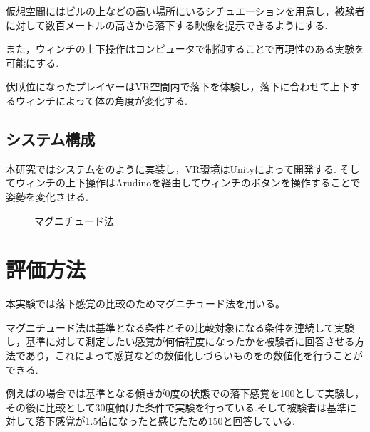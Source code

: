 \documentclass[uplatex]{jsarticle}
\begin{document}
仮想空間にはビルの上などの高い場所にいるシチュエーションを用意し，被験者に対して数百メートルの高さから落下する映像を提示できるようにする.

また，ウィンチの上下操作はコンピュータで制御することで再現性のある実験を可能にする.

伏臥位になったプレイヤーはVR空間内で落下を体験し，落下に合わせて上下するウィンチによって体の角度が変化する.

\subsection{システム構成}
本研究ではシステムをのように実装し，VR環境はUnityによって開発する.
そしてウィンチの上下操作はArudinoを経由してウィンチのボタンを操作することで姿勢を変化させる.


 \begin{figure}[tb]
  \centering
  \caption{マグニチュード法}
  \label{fig:magnitude}

\end{figure}

\section{評価方法}
本実験では落下感覚の比較のためマグニチュード法を用いる。

マグニチュード法は基準となる条件とその比較対象になる条件を連続して実験し，基準に対して測定したい感覚が何倍程度になったかを被験者に回答させる方法であり，これによって感覚などの数値化しづらいものをの数値化を行うことができる.

例えばの場合では基準となる傾きが0度の状態での落下感覚を100として実験し，その後に比較として30度傾けた条件で実験を行っている.そして被験者は基準に対して落下感覚が1.5倍になったと感じたため150と回答している.
\end{document}
